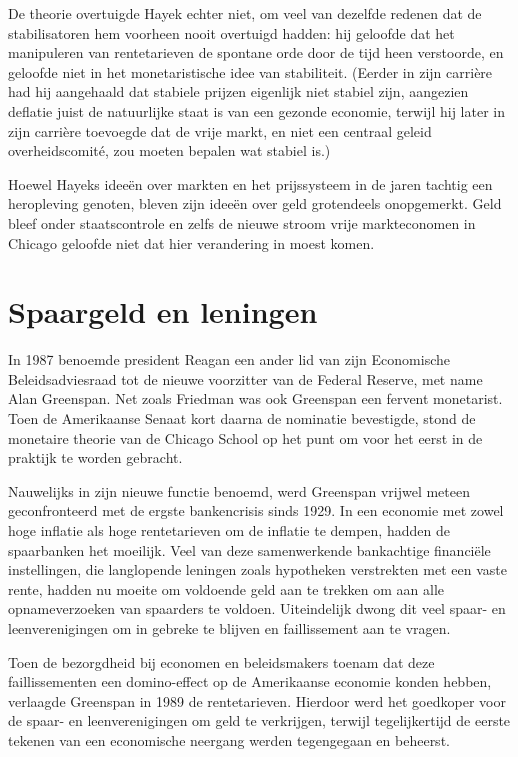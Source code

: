 \documentclass[
  a5paper,
  smalldemyvopaper,11pt,twoside,onecolumn,openright,extrafontsizes]{memoir}
\begin{document}
De theorie overtuigde Hayek echter niet, om veel van dezelfde redenen
dat de stabilisatoren hem voorheen nooit overtuigd hadden: hij geloofde
dat het manipuleren van rentetarieven de spontane orde door de tijd heen
verstoorde, en geloofde niet in het monetaristische idee van
stabiliteit. (Eerder in zijn carrière had hij aangehaald dat stabiele
prijzen eigenlijk niet stabiel zijn, aangezien deflatie juist de
natuurlijke staat is van een gezonde economie, terwijl hij later in zijn
carrière toevoegde dat de vrije markt, en niet een centraal geleid
overheidscomité, zou moeten bepalen wat stabiel is.)

Hoewel Hayeks ideeën over markten en het prijssysteem in de jaren
tachtig een heropleving genoten, bleven zijn ideeën over geld
grotendeels onopgemerkt. Geld bleef onder staatscontrole en zelfs de
nieuwe stroom vrije markteconomen in Chicago geloofde niet dat hier
verandering in moest komen.

\section{Spaargeld en leningen}\label{spaargeld-en-leningen}

In 1987 benoemde president Reagan een ander lid van zijn Economische
Beleidsadviesraad tot de nieuwe voorzitter van de Federal Reserve, met
name Alan Greenspan. Net zoals Friedman was ook Greenspan een fervent
monetarist. Toen de Amerikaanse Senaat kort daarna de nominatie
bevestigde, stond de monetaire theorie van de Chicago School op het punt
om voor het eerst in de praktijk te worden gebracht.

Nauwelijks in zijn nieuwe functie benoemd, werd Greenspan vrijwel meteen
geconfronteerd met de ergste bankencrisis sinds 1929. In een economie
met zowel hoge inflatie als hoge rentetarieven om de inflatie te dempen,
hadden de spaarbanken het moeilijk. Veel van deze samenwerkende
bankachtige financiële instellingen, die langlopende leningen zoals
hypotheken verstrekten met een vaste rente, hadden nu moeite om
voldoende geld aan te trekken om aan alle opnameverzoeken van spaarders
te voldoen. Uiteindelijk dwong dit veel spaar- en leenverenigingen om in
gebreke te blijven en faillissement aan te vragen.

Toen de bezorgdheid bij economen en beleidsmakers toenam dat deze
faillissementen een domino-effect op de Amerikaanse economie konden
hebben, verlaagde Greenspan in 1989 de rentetarieven. Hierdoor werd het
goedkoper voor de spaar- en leenverenigingen om geld te verkrijgen,
terwijl tegelijkertijd de eerste tekenen van een economische neergang
werden tegengegaan en beheerst.
\end{document}
